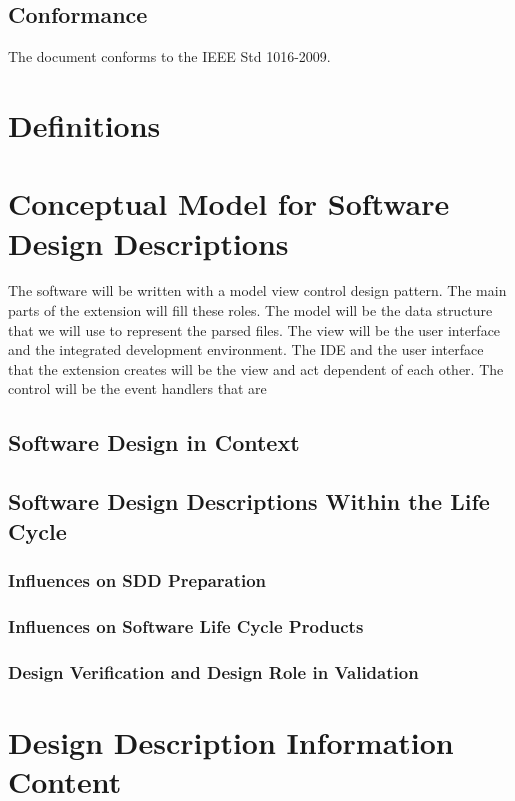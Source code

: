 \documentclass[letterpaper,10pt,titlepage,draftclsnofoot,onecolumn,onesided] {IEEEtran}
\begin{document}
\subsection{Conformance}
The document conforms to the IEEE Std 1016-2009.

\section{Definitions}

\section{Conceptual Model for Software Design Descriptions}
The software will be written with a model view control design pattern.
The main parts of the extension will fill these roles.
The model will be the data structure that we will use to represent the parsed files. 
The view will be the user interface and the integrated development environment.
The IDE and the user interface that the extension creates will be the view and act dependent of each other.
The control will be the event handlers that are 

\subsection{Software Design in Context}

\subsection{Software Design Descriptions Within the Life Cycle}
\subsubsection{Influences on SDD Preparation}
\subsubsection{Influences on Software Life Cycle Products}
\subsubsection{Design Verification and Design Role in Validation}

\section{Design Description Information Content}
\end{document}
